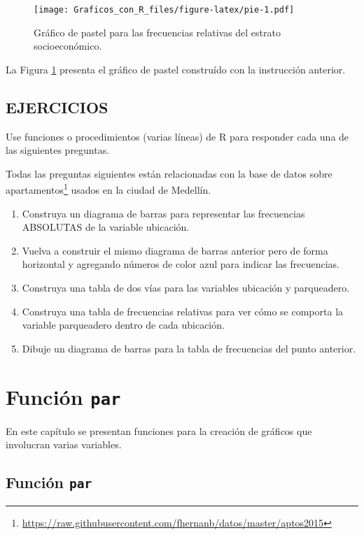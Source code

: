 \documentclass[10pt,]{krantz}
\providecommand{\tightlist}{%
  \setlength{\itemsep}{0pt}\setlength{\parskip}{0pt}}
\let\proglang=\textsf
\renewcommand{\href}[2]{#2\footnote{\url{#1}}}
\begin{document}
\begin{figure}[htbp]
\centering
\texttt{[image: Graficos\_con\_R\_files/figure-latex/pie-1.pdf]}
\caption{\label{fig:pie}Gráfico de pastel para las frecuencias relativas del
estrato socioeconómico.}
\end{figure}

La Figura \ref{fig:pie} presenta el gráfico de pastel construído con la
instrucción anterior.

\section*{EJERCICIOS}\label{ejercicios}


Use funciones o procedimientos (varias líneas) de \proglang{R} para
responder cada una de las siguientes preguntas.

Todas las preguntas siguientes están relacionadas con la base de datos
sobre
\href{https://raw.githubusercontent.com/fhernanb/datos/master/aptos2015}{apartamentos}
usados en la ciudad de Medellín.

\begin{enumerate}
\def\labelenumi{\arabic{enumi}.}
\tightlist
\item
  Construya un diagrama de barras para representar las frecuencias
  ABSOLUTAS de la variable ubicación.
\item
  Vuelva a construir el mismo diagrama de barras anterior pero de forma
  horizontal y agregando números de color azul para indicar las
  frecuencias.
\item
  Construya una tabla de dos vías para las variables ubicación y
  parqueadero.
\item
  Construya una tabla de frecuencias relativas para ver cómo se comporta
  la variable parqueadero dentro de cada ubicación.
\item
  Dibuje un diagrama de barras para la tabla de frecuencias del punto
  anterior.
\end{enumerate}

\chapter{\texorpdfstring{Función
\texttt{par}}{Función par}}\label{funcion-par}

En este capítulo se presentan funciones para la creación de gráficos que
involucran varias variables.

\section{\texorpdfstring{Función \texttt{par}
}{Función par }}\label{funcion-par-1}
\end{document}
